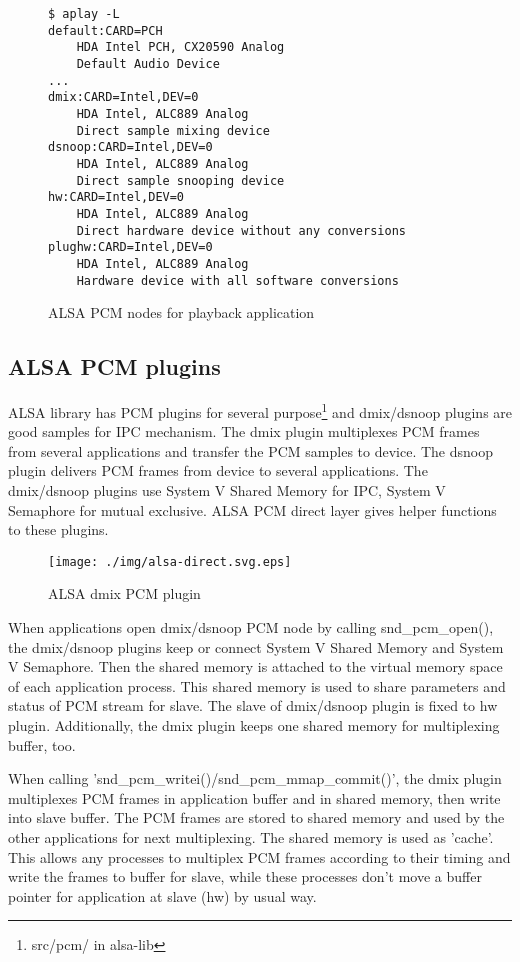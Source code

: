 \documentclass[onecolumn]{article}
\begin{document}
\begin{figure}[htbp]
\small
\begin{verbatim}
$ aplay -L
default:CARD=PCH
    HDA Intel PCH, CX20590 Analog
    Default Audio Device
...
dmix:CARD=Intel,DEV=0
    HDA Intel, ALC889 Analog
    Direct sample mixing device
dsnoop:CARD=Intel,DEV=0
    HDA Intel, ALC889 Analog
    Direct sample snooping device
hw:CARD=Intel,DEV=0
    HDA Intel, ALC889 Analog
    Direct hardware device without any conversions
plughw:CARD=Intel,DEV=0
    HDA Intel, ALC889 Analog
    Hardware device with all software conversions
\end{verbatim}
\caption{ALSA PCM nodes for playback application}
\label{pcm-nodes-playback}
\end{figure}

\subsection{ALSA PCM plugins}
ALSA library has PCM plugins for several purpose\footnote{src/pcm/ in alsa-lib} and dmix/dsnoop plugins are good samples for IPC mechanism. The dmix plugin multiplexes PCM frames from several applications and transfer the PCM samples to device. The dsnoop plugin delivers PCM frames from device to several applications. The dmix/dsnoop plugins use System V Shared Memory for IPC, System V Semaphore for mutual exclusive. ALSA PCM direct layer gives helper functions to these plugins.

\begin{figure}[htbp]
	\centering
	\texttt{[image: ./img/alsa-direct.svg.eps]}
	\caption{ALSA dmix PCM plugin}
	\label{alsa_direct}
\end{figure}


When applications open dmix/dsnoop PCM node by calling snd\_pcm\_open(), the dmix/dsnoop plugins keep or connect System V Shared Memory and System V Semaphore. Then the shared memory is attached to the virtual memory space of each application process. This shared memory is used to share parameters and status of PCM stream for slave. The slave of dmix/dsnoop plugin is fixed to hw plugin. Additionally, the dmix plugin keeps one shared memory for multiplexing buffer, too.

When calling 'snd\_pcm\_writei()/snd\_pcm\_mmap\_commit()', the dmix plugin multiplexes PCM frames in application buffer and in shared memory, then write into slave buffer. The PCM frames are stored to shared memory and used by the other applications for next multiplexing. The shared memory is used as 'cache'. This allows any processes to multiplex PCM frames according to their timing and write the frames to buffer for slave, while these processes don't move a buffer pointer for application at slave (hw) by usual way.
\end{document}
